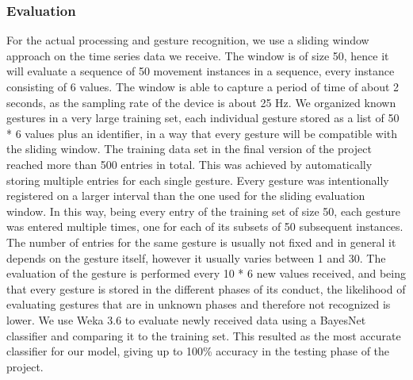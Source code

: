 \subsubsection{Evaluation}
For the actual processing and gesture recognition, we use a sliding window approach on the time series data we receive.
The window is of size 50, hence it will evaluate a sequence of 50 movement instances in a sequence,
every instance consisting of 6 values.
The window is able to capture a period of time of about 2 seconds, as the sampling rate of the device is about 25 Hz.
We organized known gestures in a very large training set, each individual gesture stored as a list of 50 * 6 values plus an identifier, in a way that every gesture will be compatible with the sliding window. 
The training data set in the final version of the project reached more than 500 entries in total.
This was achieved by automatically storing multiple entries for each single gesture.
Every gesture was intentionally registered on a larger interval than the one used for the sliding evaluation window.
In this way, being every entry of the training set of size 50,  each gesture was entered multiple times, one for each of its subsets of 50 subsequent instances.
The number of entries for the same gesture is usually not fixed and in general it depends on the gesture itself, however it usually varies between 1 and 30.
The evaluation of the gesture is performed every 10 * 6 new values received, and being that every gesture is stored in the different phases of its conduct, the likelihood of evaluating gestures that are in unknown phases and therefore not recognized is lower.
We use Weka 3.6 to evaluate newly received data using a BayesNet classifier and comparing it to the training set. 
This resulted as the most accurate classifier for our model, giving up to 100\% accuracy in the testing phase of the project.




